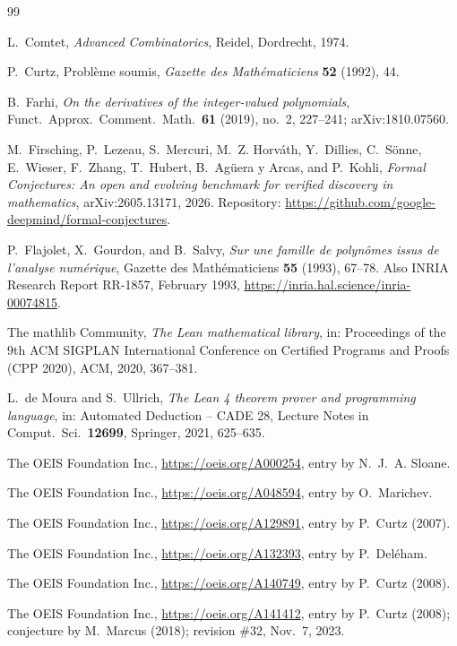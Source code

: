 \documentclass[11pt]{amsart}
\theoremstyle{plain}
\theoremstyle{definition}
\begin{document}
{\small
\begin{thebibliography}{99}

L.~Comtet, \emph{Advanced Combinatorics}, Reidel, Dordrecht, 1974.

P.~Curtz, Probl\`eme soumis, \emph{Gazette des Math\'ematiciens} \textbf{52} (1992), 44.

B.~Farhi, \emph{On the derivatives of the integer-valued polynomials}, Funct.\ Approx.\ Comment.\ Math.\ \textbf{61} (2019), no.~2, 227--241; arXiv:1810.07560.

M.~Firsching, P.~Lezeau, S.~Mercuri, M.~Z. Horv\'ath, Y.~Dillies, C.~S\"onne, E.~Wieser, F.~Zhang, T.~Hubert, B.~Ag\"uera y Arcas, and P.~Kohli, \emph{Formal Conjectures: An open and evolving benchmark for verified discovery in mathematics}, arXiv:2605.13171, 2026. Repository: \url{https://github.com/google-deepmind/formal-conjectures}.

P.~Flajolet, X.~Gourdon, and B.~Salvy, \emph{Sur une famille de polyn\^omes issus de l'analyse num\'erique}, Gazette des Math\'ematiciens \textbf{55} (1993), 67--78. Also INRIA Research Report RR-1857, February 1993, \url{https://inria.hal.science/inria-00074815}.

The mathlib Community, \emph{The Lean mathematical library}, in: Proceedings of the 9th ACM SIGPLAN International Conference on Certified Programs and Proofs (CPP 2020), ACM, 2020, 367--381.

L.~de Moura and S.~Ullrich, \emph{The Lean 4 theorem prover and programming language}, in: Automated Deduction -- CADE 28, Lecture Notes in Comput.\ Sci.\ \textbf{12699}, Springer, 2021, 625--635.

The OEIS Foundation Inc., \url{https://oeis.org/A000254}, entry by N.~J.~A. Sloane.

The OEIS Foundation Inc., \url{https://oeis.org/A048594}, entry by O.~Marichev.

The OEIS Foundation Inc., \url{https://oeis.org/A129891}, entry by P.~Curtz (2007).

The OEIS Foundation Inc., \url{https://oeis.org/A132393}, entry by P.~Del\'eham.

The OEIS Foundation Inc., \url{https://oeis.org/A140749}, entry by P.~Curtz (2008).

The OEIS Foundation Inc., \url{https://oeis.org/A141412}, entry by P.~Curtz (2008); conjecture by M.~Marcus (2018); revision \#32, Nov.~7, 2023.

\end{thebibliography}
}
\end{document}
